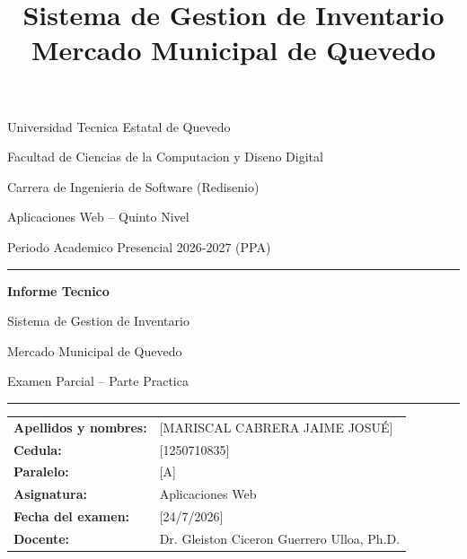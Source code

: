\documentclass[11pt,a4paper]{article}
\title{\Large \textbf{Sistema de Gestion de Inventario} \\ \large Mercado Municipal de Quevedo}
\author{}
\date{}
\begin{document}
\begin{titlepage}
    \centering
    \vspace*{1cm}

    {\large Universidad Tecnica Estatal de Quevedo\par}
    {\large Facultad de Ciencias de la Computacion y Diseno Digital\par}
    {\large Carrera de Ingenieria de Software (Redisenio)\par}
    \vspace{0.5cm}
    {\normalsize Aplicaciones Web -- Quinto Nivel\par}
    {\normalsize Periodo Academico Presencial 2026-2027 (PPA)\par}

    \vspace{2cm}
    \rule{\linewidth}{0.5pt}
    \vspace{0.5cm}
    {\Huge \textbf{Informe Tecnico}\par}
    \vspace{0.3cm}
    {\Large Sistema de Gestion de Inventario\par}
    {\Large Mercado Municipal de Quevedo\par}
    \vspace{0.3cm}
    {\large Examen Parcial -- Parte Practica\par}
    \rule{\linewidth}{0.5pt}

    \vspace{2cm}
    \begin{tabular}{ll}
        \textbf{Apellidos y nombres:} & [MARISCAL CABRERA JAIME JOSUÉ] \\[4pt]
        \textbf{Cedula:}              & [1250710835] \\[4pt]
        \textbf{Paralelo:}            & [A] \\[4pt]
        \textbf{Asignatura:}          & Aplicaciones Web \\[4pt]
        \textbf{Fecha del examen:}    & [24/7/2026] \\[4pt]
        \textbf{Docente:}             & Dr. Gleiston Ciceron Guerrero Ulloa, Ph.D. \\
    \end{tabular}

    \vspace{2cm}


\end{titlepage}
\end{document}
